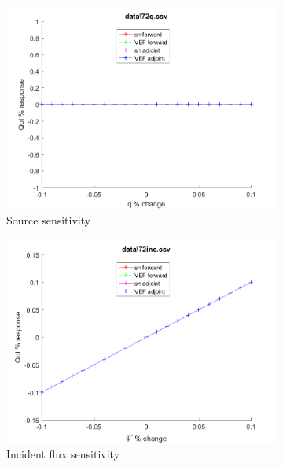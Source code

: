 \documentclass{article}
\begin{document}
\begin{figure}[H]
\label{Case72Sens}
\centering
\begin{subfigure}{.5\textwidth}
  \centering
  \includegraphics[width=.98\linewidth]{IanProposal/figures2/72qSens.png}
  \caption{Source sensitivity}
  \label{fig:sfig1}
\end{subfigure}%
\begin{subfigure}{.5\textwidth}
  \centering
  \includegraphics[width=.98\linewidth]{IanProposal/figures2/72incSens.png}
  \caption{Incident flux sensitivity}
  \label{fig:sfig4}
\end{subfigure}%
\\
\begin{subfigure}{.5\textwidth}
  \centering

\end{subfigure}
\end{figure}
\end{document}
